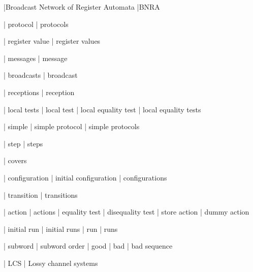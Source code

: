 

|Broadcast Network of Register Automata
|BNRA


| protocol
| protocols

| register value
| register values

| messages
| message

| broadcasts
| broadcast

| receptions
| reception

| local tests
| local test
| local equality test
| local equality tests

| simple
| simple protocol
| simple protocols

| step
| steps

| covers

| configuration
| initial configuration
| configurations

| transition
| transitions

| action
| actions
| equality test
| disequality test
| store action
| dummy action


| initial run
| initial runs
| run
| runs

| subword 
| subword order
| good
| bad
| bad sequence

| LCS 
| Lossy channel systems

